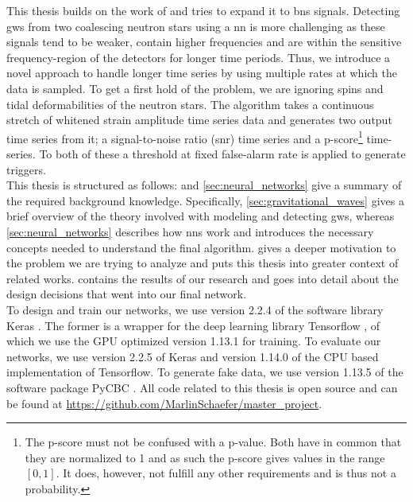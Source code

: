 This thesis builds on the work of \cite{original_deep_filtering} and tries to expand it to \gls{bns} signals. Detecting \gls{gw}s from two coalescing neutron stars using a \gls{nn} is more challenging as these signals tend to be weaker, contain higher frequencies and are within the sensitive frequency-region of the detectors for longer time periods. Thus, we introduce a novel approach to handle longer time series by using multiple rates at which the data is sampled. To get a first hold of the problem, we are ignoring spins and tidal deformabilities of the neutron stars. The algorithm takes a continuous stretch of whitened strain amplitude time series data and generates two output time series from it; a signal-to-noise ratio (\gls{snr}) time series and a p-score\footnote{The p-score must not be confused with a p-value. Both have in common that they are normalized to 1 and as such the p-score gives values in the range $\left[0,1\right]$. It does, however, not fulfill any other requirements and is thus not a probability.} time-series. To both of these a threshold at fixed false-alarm rate is applied to generate triggers.\medskip\\
This thesis is structured as follows:  and \autoref{sec:neural_networks} give a summary of the required background knowledge. Specifically, \autoref{sec:gravitational_waves} gives a brief overview of the theory involved with modeling and detecting \gls{gw}s, whereas \autoref{sec:neural_networks} describes how \gls{nn}s work and introduces the necessary concepts needed to understand the final algorithm.  gives a deeper motivation to the problem we are trying to analyze and puts this thesis into greater context of related works.  contains the results of our research and goes into detail about the design decisions that went into our final network.\medskip\\
To design and train our networks, we use version 2.2.4 of the software library Keras \cite{keras}. The former is a wrapper for the deep learning library Tensorflow \cite{tensorflow}, of which we use the GPU optimized version 1.13.1 for training. To evaluate our networks, we use version 2.2.5 of Keras and version 1.14.0 of the CPU based implementation of Tensorflow. To generate fake data, we use version 1.13.5 of the software package PyCBC \cite{pycbc}. All code related to this thesis is open source and can be found at \url{https://github.com/MarlinSchaefer/master_project}.
